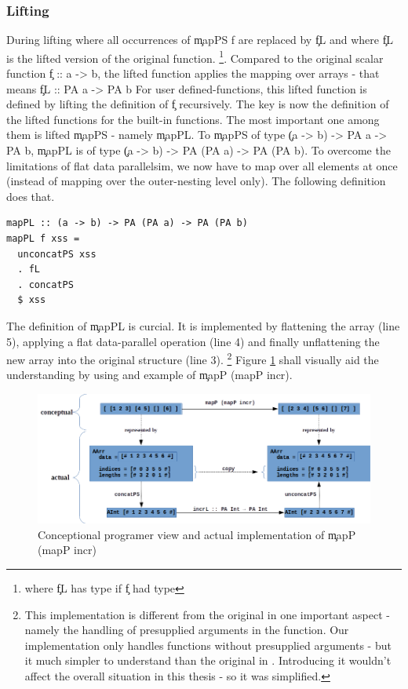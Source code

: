       
    \subsubsection{Lifting}
      During lifting where all occurrences of \c{mapPS f} are
      replaced by \c{fL} and where \c{fL}
      is the lifted version of the original function.
      \footnote{where \c{fL} has type 
        if \c{f} had type 
      }.
      Compared to the original scalar function \c{f :: a -> b}, the lifted
      function applies the mapping over arrays - that means \c{fL :: PA a -> PA b}
      For user defined-functions, this lifted function is defined
      by lifting the definition of \c{f} recursively.
      The key is now the definition of the lifted functions for the built-in functions.
      The most important one among them is lifted \c{mapPS} - namely \c{mapPL}.
      To \c{mapPS} of type \c{(a -> b) -> PA a -> PA b},
      \c{mapPL} is of type \c{(a -> b) -> PA (PA a) -> PA (PA b)}.
      To overcome the limitations of flat data parallelsim,
      we now have to map over all elements at once
      (instead of mapping over the outer-nesting level only).
      The following definition does that.
    \begin{lstlisting}
mapPL :: (a -> b) -> PA (PA a) -> PA (PA b)
mapPL f xss =
  unconcatPS xss
  . fL
  . concatPS
  $ xss
    \end{lstlisting}
    The definition of \c{mapPL} is curcial. It is implemented by flattening the array (line 5), applying a flat data-parallel operation (line 4)
    and finally unflattening the new array into the original structure (line 3).
    \footnote{This implementation is different from the original in one important aspect - 
    namely the handling of presupplied arguments in the function. Our
    implementation only handles functions without presupplied arguments -
    but it much simpler to understand than the original in \cite{Harness2008}.
    Introducing it wouldn't affect the overall situation in this thesis -
    so it was simplified.
    }
    Figure \ref{figure:mapP} shall visually aid the understanding by using
    and example of \c{mapP (mapP incr)}.
    
    \begin{figure}[h!]
        \begin{center}
        \includegraphics[width=\linewidth]{mapP.png}
        \caption{Conceptional programer view and actual implementation of \c{mapP (mapP incr)}}
        \label{figure:mapP}
        \end{center}
    \end{figure}
    
